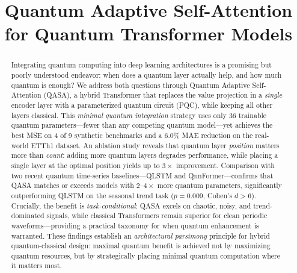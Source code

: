 \documentclass[conference]{IEEEtran}
\begin{document}
\title{Quantum Adaptive Self-Attention for Quantum Transformer Models}

\author{
  \and
}

\maketitle

\begin{abstract}
Integrating quantum computing into deep learning architectures is a promising but poorly understood endeavor: when does a quantum layer actually help, and how much quantum is enough?
We address both questions through Quantum Adaptive Self-Attention (QASA), a hybrid Transformer that replaces the value projection in a \emph{single} encoder layer with a parameterized quantum circuit (PQC), while keeping all other layers classical.
This \emph{minimal quantum integration} strategy uses only 36 trainable quantum parameters---fewer than any competing quantum model---yet achieves the best MSE on 4 of 9 synthetic benchmarks and a 6.0\% MAE reduction on the real-world ETTh1 dataset.
An ablation study reveals that quantum layer \emph{position} matters more than \emph{count}: adding more quantum layers degrades performance, while placing a single layer at the optimal position yields up to $3\times$ improvement.
Comparison with two recent quantum time-series baselines---QLSTM and QnnFormer---confirms that QASA matches or exceeds models with $2$--$4\times$ more quantum parameters, significantly outperforming QLSTM on the seasonal trend task ($p{=}0.009$, Cohen's $d{>}6$).
Crucially, the benefit is \emph{task-conditional}: QASA excels on chaotic, noisy, and trend-dominated signals, while classical Transformers remain superior for clean periodic waveforms---providing a practical taxonomy for when quantum enhancement is warranted.
These findings establish an \emph{architectural parsimony} principle for hybrid quantum-classical design: maximal quantum benefit is achieved not by maximizing quantum resources, but by strategically placing minimal quantum computation where it matters most.
\end{abstract}
\end{document}
